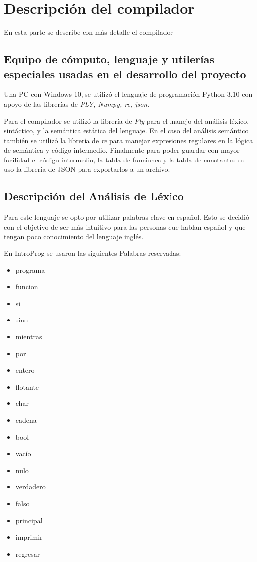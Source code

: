 \chapter{Descripción del compilador}

En esta parte se describe con más detalle el compilador

\section{Equipo de cómputo, lenguaje y utilerías especiales usadas en el desarrollo del proyecto}

Una PC con Windows 10, se utilizó el lenguaje de programación Python 3.10 con apoyo de las librerías de \emph{PLY, Numpy, re, json}.

Para el compilador se utilizó la librería de \emph{Ply} para el manejo del análisis léxico, sintáctico, y la semántica estática del lenguaje. En el caso del análisis semántico también se utilizó la librería de \emph{re} para manejar expresiones regulares en la lógica de semántica y código intermedio. Finalmente para poder guardar con mayor facilidad el código intermedio, la tabla de funciones y la tabla de constantes se uso la librería de JSON para exportarlos a un archivo.


\FloatBarrier
\section{Descripción del Análisis de Léxico}

Para este lenguaje se opto por utilizar palabras clave en español. Esto se decidió con el objetivo de ser más intuitivo para las personas que hablan español y que tengan poco conocimiento del lenguaje inglés.

En IntroProg se usaron las siguientes Palabras reservadas:
\begin{itemize}
    \item programa
    \item funcion
    \item si
    \item sino
    \item mientras
    \item por
    \item entero
    \item flotante
    \item char
    \item cadena
    \item bool
    \item vacío
    \item nulo
    \item verdadero
    \item falso
    \item principal
    \item imprimir
    \item regresar
\end{itemize}


